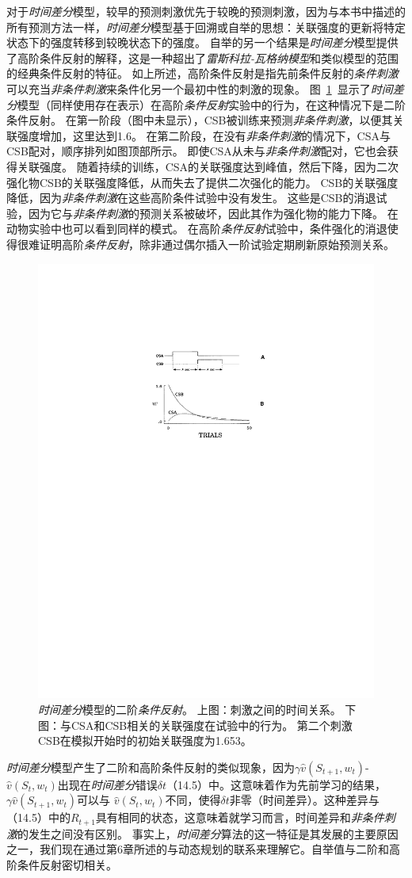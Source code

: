 对于\textit{时间差分}模型，较早的预测刺激优先于较晚的预测刺激，因为与本书中描述的所有预测方法一样，\textit{时间差分}模型基于回溯或自举的思想：关联强度的更新将特定状态下的强度转移到较晚状态下的强度。
自举的另一个结果是\textit{时间差分}模型提供了高阶条件反射的解释，这是一种超出了\textit{雷斯科拉-瓦格纳模型}和类似模型的范围的经典条件反射的特征。
如上所述，高阶条件反射是指先前条件反射的\textit{条件刺激}可以充当\textit{非条件刺激}来条件化另一个最初中性的刺激的现象。
图~\ref{fig:11_5}~显示了\textit{时间差分}模型（同样使用存在表示）在高阶\textit{条件反射}实验中的行为，在这种情况下是二阶条件反射。
在第一阶段（图中未显示），CSB被训练来预测\textit{非条件刺激}，以便其关联强度增加，这里达到1.6。
在第二阶段，在没有\textit{非条件刺激}的情况下，CSA与CSB配对，顺序排列如图顶部所示。
即使CSA从未与\textit{非条件刺激}配对，它也会获得关联强度。
随着持续的训练，CSA的关联强度达到峰值，然后下降，因为二次强化物CSB的关联强度降低，从而失去了提供二次强化的能力。
CSB的关联强度降低，因为\textit{非条件刺激}在这些高阶条件试验中没有发生。
这些是CSB的消退试验，因为它与\textit{非条件刺激}的预测关系被破坏，因此其作为强化物的能力下降。
在动物实验中也可以看到同样的模式。
在高阶\textit{条件反射}试验中，条件强化的消退使得很难证明高阶\textit{条件反射}，除非通过偶尔插入一阶试验定期刷新原始预测关系。


\begin{figure}[!htb]
	\centering
	\includegraphics[width=0.5\linewidth]{chap11/fig_11_5}
	\caption{\textit{时间差分}模型的二阶\textit{条件反射}。
		上图：刺激之间的时间关系。
		下图：与CSA和CSB相关的关联强度在试验中的行为。
		第二个刺激CSB在模拟开始时的初始关联强度为1.653\cite{sutton1990integrated}。
	 \label{fig:11_5}}
\end{figure}


\textit{时间差分}模型产生了二阶和高阶条件反射的类似现象，因为$\gamma\hat v(S_{t+1},w_t)$-$\hat v(S_t,w_t)$出现在\textit{时间差分}错误$\delta t$（14.5）中。这意味着作为先前学习的结果，$\gamma\hat v(S_{t+1},w_t)$可以与 $\hat v(S_t,w_t)$不同，使得$\delta t$非零（时间差异）。这种差异与（14.5）中的$R_{t+1}$具有相同的状态，这意味着就学习而言，时间差异和\textit{非条件刺激}的发生之间没有区别。
事实上，\textit{时间差分}算法的这一特征是其发展的主要原因之一，我们现在通过第6章所述的与动态规划的联系来理解它。自举值与二阶和高阶条件反射密切相关。


